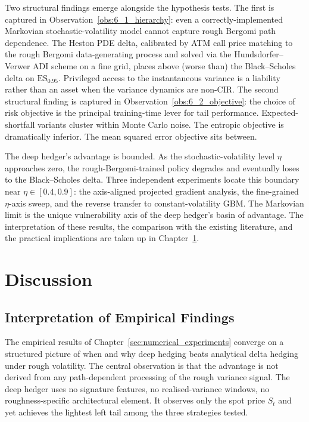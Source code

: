 \documentclass[12pt,a4paper]{article}
\theoremstyle{definition}
\theoremstyle{plain}
\theoremstyle{remark}
\theoremstyle{plain}
\begin{document}
Two structural findings emerge alongside the hypothesis tests. The
first is captured in Observation~\ref{obs:6_1_hierarchy}: even a
correctly-implemented Markovian stochastic-volatility model cannot
capture rough Bergomi path dependence. The Heston PDE delta,
calibrated by ATM call price matching to the rough Bergomi
data-generating process and solved via the Hundsdorfer--Verwer ADI
scheme on a fine grid, places above (worse than) the Black--Scholes
delta on $\mathrm{ES}_{0.95}$. Privileged access to the instantaneous
variance is a liability rather than an asset when the variance
dynamics are non-CIR. The second structural finding is captured in
Observation~\ref{obs:6_2_objective}: the choice of risk objective is
the principal training-time lever for tail performance.
Expected-shortfall variants cluster within Monte Carlo noise. The
entropic objective is dramatically inferior. The mean squared error
objective sits between.

The deep hedger's advantage is bounded. As the stochastic-volatility
level $\eta$ approaches zero, the rough-Bergomi-trained policy
degrades and eventually loses to the Black--Scholes delta. Three
independent experiments locate this boundary near
$\eta \in [0.4, 0.9]$: the axis-aligned projected gradient analysis,
the fine-grained $\eta$-axis sweep, and the reverse transfer to
constant-volatility GBM. The Markovian limit is the unique
vulnerability axis of the deep hedger's basin of advantage. The
interpretation of these results, the comparison with the existing
literature, and the practical implications are taken up in
Chapter~\ref{sec:discussion}.

\section{Discussion}
\label{sec:discussion}

\subsection{Interpretation of Empirical Findings}
\label{sec:7_1_interpretation}

The empirical results of Chapter~\ref{sec:numerical_experiments}
converge on a structured picture of when and why deep hedging beats
analytical delta hedging under rough volatility. The central
observation is that the advantage is not derived from any
path-dependent processing of the rough variance signal. The deep
hedger uses no signature features, no realised-variance windows, no
roughness-specific architectural element. It observes only the spot
price $S_t$ and yet achieves the lightest left tail among the three
strategies tested.
\end{document}
